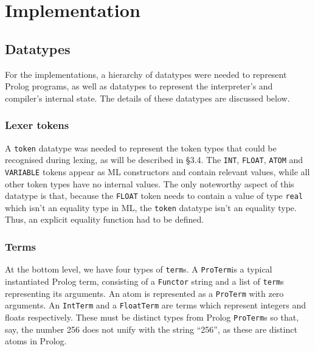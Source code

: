 \documentclass[12pt]{article}
\begin{document}
\newpage

\section{Implementation}


\subsection{Datatypes}

For the implementations, a hierarchy of datatypes were needed to represent Prolog programs, as well as datatypes to represent the interpreter's and compiler's internal state. The details of these datatypes are discussed below.

\subsubsection{Lexer tokens}

A \verb|token| datatype was needed to represent the token types that could be recognised during lexing, as will be described in \S3.4. 
The \verb|INT|, \verb|FLOAT|, \verb|ATOM| and \verb|VARIABLE| tokens appear as ML constructors and contain relevant values, while all other token types have no internal values. 
The only noteworthy aspect of this datatype is that, because the \verb|FLOAT| token needs to contain a value of type \verb|real| which isn't an equality type in ML, the \verb|token| datatype isn't an equality type. 
Thus, an explicit equality function had to be defined.

\subsubsection{Terms}

At the bottom level, we have four types of \verb|term|s. 
A \verb|ProTerm|\footnotemark[1] is a typical instantiated Prolog term, consisting of a \verb|Functor| string and a list of \verb|term|s representing its arguments. 
An atom is represented as a \verb|ProTerm| with zero arguments.
An \verb|IntTerm| and a \verb|FloatTerm| are terms which represent integers and floats respectively. 
These must be distinct types from Prolog \verb|ProTerm|s so that, say, the number 256 does not unify with the string ``256'', as these are distinct atoms in Prolog.

\end{document}
